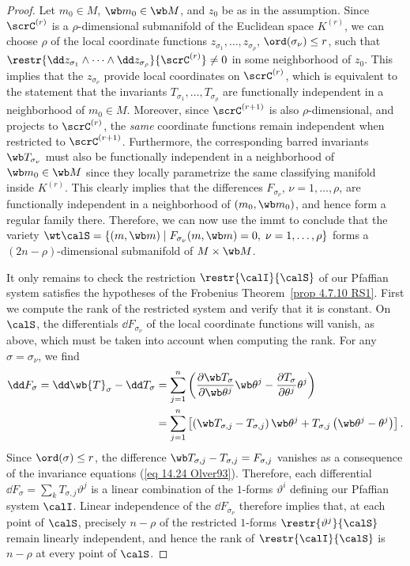 \begin{proof}
    Let $m_0\in M$, $\wb m_0\in \wb M$, and $z_0$ be as in the assumption. Since $\scrC^{(r)}$ is a $\rho$-dimensional submanifold of the Euclidean space $K^{(r)}$, we can choose $\rho$ of the local coordinate functions $z_{\sigma_1},\ldots,z_{\sigma_\rho}$, $\ord(\sigma_\nu)\leq r$, such that $\restr{\dd z_{\sigma_1}\wedge\cdots\wedge\dd z_{\sigma_\rho}}{\scrC^{(r)}}\neq 0$ in some neighborhood of $z_0$. This implies that the $z_{\sigma_\nu}$ provide local coordinates on $\scrC^{(r)}$, which is equivalent to the statement that the invariants $T_{\sigma_1},\ldots,T_{\sigma_\rho}$ are functionally independent in a neighborhood of $m_0\in M$. Moreover, since $\scrC^{(r+1)}$ is also $\rho$-dimensional, and projects to $\scrC^{(r)}$, the \emph{same} coordinate functions remain independent when restricted to $\scrC^{(r+1)}$. Furthermore, the corresponding barred invariants $\wb T_{\sigma_\nu}$ must also be functionally independent in a neighborhood of $\wb m_0\in \wb M$ since they locally parametrize the same classifying manifold inside $K^{(r)}$.  This clearly implies that the differences $F_{\sigma_\nu}$, $\nu=1,\ldots,\rho$, are functionally independent in a neighborhood of $(m_0,\wb m_0)$, and hence form a regular family there. Therefore, we can now use the \gls{immt} to conclude that the variety $\wt\calS=\{(m,\wb m)\mid F_{\sigma_\nu}(m,\wb m)=0,\; \nu=1,\ldots,\rho\}$ forms a $(2n-\rho)$-dimensional submanifold of $M\times \wb M$.

    It only remains to check the restriction $\restr{\calI}{\calS}$ of our Pfaffian system satisfies the hypotheses of the Frobenius Theorem~\ref{prop 4.7.10 RS1}. First we compute the rank of the restricted system and verify that it is constant. On $\calS$, the differentials $\dd F_{\sigma_\nu}$ of the local coordinate functions will vanish, as above, which must be taken into account when computing the rank. For any $\sigma=\sigma_\nu$, we find 
    \begin{align}
        \dd F_\sigma=\dd \wb{T}_\sigma-\dd T_\sigma&=\sum_{j=1}^n \left(\frac{\partial \wb T_\sigma}{\partial \wb\theta^j}\wb\theta^j-\frac{\partial T_\sigma}{\partial \theta^j}\theta^j\right)\notag\\
        &=\sum_{j=1}^n\left[\left(\wb T_{\sigma,j}-T_{\sigma,j}\right)\wb\theta^j+T_{\sigma,j}\left(\wb\theta^j-\theta^j\right)\right].
    \end{align}
    Since $\ord(\sigma)\leq r$, the difference $\wb T_{\sigma,j}-T_{\sigma,j}=F_{\sigma,j}$ vanishes as a consequence of the invariance equations (\ref{eq 14.24 Olver93}). Therefore, each differential $\dd F_\sigma=\sum_k T_{\sigma,j}\vartheta^j$ is a linear combination of the $1$-forms $\vartheta^i$ defining our Pfaffian system $\calI$. Linear independence of the $\dd F_{\sigma_\nu}$ therefore implies that, at each point of $\calS$, precisely $n-\rho$ of the restricted $1$-forms $\restr{\vartheta^j}{\calS}$ remain linearly independent, and hence the rank of $\restr{\calI}{\calS}$ is $n-\rho$ at every point of $\calS$.


\end{proof}

